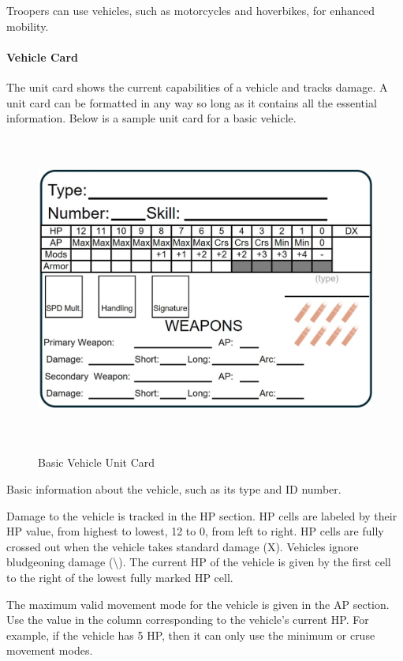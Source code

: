 Troopers can use vehicles, such as motorcycles and hoverbikes, for enhanced mobility.

\paragraph*{Vehicle Card}

The unit card shows the current capabilities of a vehicle and tracks damage.
A unit card can be formatted in any way so long as it contains all the essential information.
Below is a sample unit card for a basic vehicle.

\begin{figure}[H]
  \centering
  \includegraphics[alt='Sample Vehicle', width=5.63in, height=4in]{img/Vehicle.png}
  \caption*{Basic Vehicle Unit Card}
\end{figure}

Basic information about the vehicle, such as its type and ID number.

Damage to the vehicle is tracked in the HP section.
HP cells are labeled by their HP value, from highest to lowest, 12 to 0, from left to right.
HP cells are fully crossed out when the vehicle takes standard damage (X).
Vehicles ignore bludgeoning damage (\textbackslash).
The current HP of the vehicle is given by the first cell to the right of the lowest fully marked HP cell.

The maximum valid movement mode for the vehicle is given in the AP section.
Use the value in the column corresponding to the vehicle's current HP.
For example, if the vehicle has 5 HP, then it can only use the minimum or cruse movement modes.

